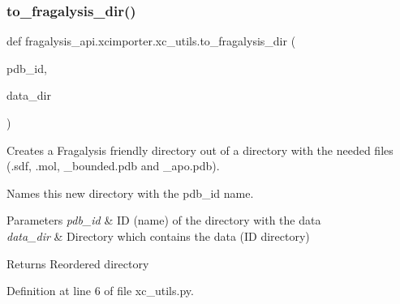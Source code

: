 \subsubsection{\texorpdfstring{to\+\_\+fragalysis\+\_\+dir()}{to\_fragalysis\_dir()}}
{\footnotesize\ttfamily def fragalysis\+\_\+api.\+xcimporter.\+xc\+\_\+utils.\+to\+\_\+fragalysis\+\_\+dir (\begin{DoxyParamCaption}\item[{}]{pdb\+\_\+id,  }\item[{}]{data\+\_\+dir }\end{DoxyParamCaption})}



Creates a Fragalysis friendly directory out of a directory with the needed files (.sdf, .mol, \+\_\+bounded.\+pdb and \+\_\+apo.\+pdb). 

Names this new directory with the pdb\+\_\+id name.


\begin{DoxyParams}{Parameters}
{\em pdb\+\_\+id} & ID (name) of the directory with the data \\
\hline
{\em data\+\_\+dir} & Directory which contains the data (ID directory) \\
\hline
\end{DoxyParams}
\begin{DoxyReturn}{Returns}
Reordered directory 
\end{DoxyReturn}


Definition at line 6 of file xc\+\_\+utils.\+py.



